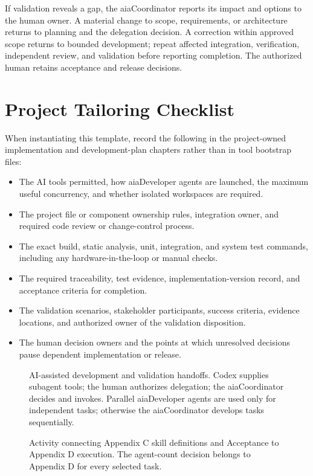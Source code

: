 If validation reveals a gap, the aiaCoordinator reports its impact and options to
the human owner. A material change to scope, requirements, or architecture
returns to planning and the delegation decision. A correction within approved
scope returns to bounded development; repeat affected integration,
verification, independent review, and validation before reporting completion.
The authorized human retains acceptance and release decisions.

\section{Project Tailoring Checklist}
\label{Section:AIImplementationTailoring}
When instantiating this template, record the following in the project-owned
implementation and development-plan chapters rather than in tool bootstrap
files:
\begin{itemize}
\item The AI tools permitted, how aiaDeveloper agents are launched, the maximum
useful concurrency, and whether isolated workspaces are required.
\item The project file or component ownership rules, integration owner, and
required code review or change-control process.
\item The exact build, static analysis, unit, integration, and system test
commands, including any hardware-in-the-loop or manual checks.
\item The required traceability, test evidence, implementation-version record,
and acceptance criteria for completion.
\item The validation scenarios, stakeholder participants, success criteria,
evidence locations, and authorized owner of the validation disposition.
\item The human decision owners and the points at which unresolved decisions
pause dependent implementation or release.
\end{itemize}

\begin{figure}[htbp]
  \centering
  \resizebox{0.98\linewidth}{!}{}
  \caption[AI-assisted development and validation handoffs.]{AI-assisted development and validation handoffs. Codex supplies subagent tools; the human authorizes delegation; the aiaCoordinator decides and invokes. Parallel aiaDeveloper agents are used only for independent tasks; otherwise the aiaCoordinator develops tasks sequentially.}
  \label{Figure:AIImplementationSequence}
\end{figure}

\begin{figure}[htbp]
  \centering
  \resizebox{0.98\linewidth}{!}{}
  \caption{Activity connecting Appendix C skill definitions and Acceptance to Appendix D execution. The agent-count decision belongs to Appendix D for every selected task.}
  \label{Figure:AITaskExecutionActivity}
\end{figure}
